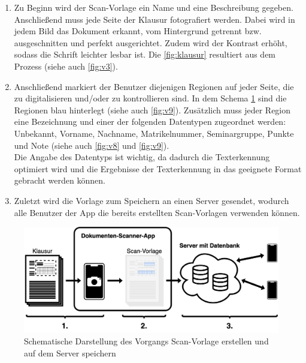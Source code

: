 \documentclass[notables, nomenclature, oneside, 150]{HSMW-Thesis}
\begin{document}
		\begin{enumerate}
			\item Zu Beginn wird der Scan-Vorlage ein Name und eine Beschreibung gegeben. Anschließend muss jede Seite der Klausur fotografiert werden. Dabei wird in jedem Bild das Dokument erkannt, vom Hintergrund getrennt bzw. ausgeschnitten und perfekt ausgerichtet. Zudem wird der Kontrast erhöht, sodass die Schrift leichter lesbar ist. Die \autoref{fig:klausur} resultiert aus dem Prozess (siehe auch \autoref{fig:v3}). 
		
			\item Anschließend markiert der Benutzer diejenigen Regionen auf jeder Seite, die zu digitalisieren und/oder zu kontrollieren sind. In dem Schema \ref{fig:schema1} sind die Regionen blau hinterlegt (siehe auch \autoref{fig:v9}). Zusätzlich muss jeder Region eine Bezeichnung und einer der folgenden Datentypen zugeordnet werden: Unbekannt, Vorname, Nachname, Matrikelnummer, Seminargruppe, Punkte und Note (siehe auch \autoref{fig:v8} und \ref{fig:v9}).\\
			Die Angabe des Datentyps ist wichtig, da dadurch die Texterkennung optimiert wird und die Ergebnisse der Texterkennung in das geeignete Format gebracht werden können. \label{it:zwei}
			
			\item Zuletzt wird die Vorlage zum Speichern an einen Server gesendet, wodurch alle Benutzer der App die bereits erstellten Scan-Vorlagen verwenden können.
		\end{enumerate}
		
		\begin{figure}[th]
    		\centering
    		\includegraphics[width=\textwidth]{img/schema1}
    		\caption{Schematische Darstellung des Vorgangs Scan-Vorlage erstellen und auf dem Server speichern}
    		\label{fig:schema1}
    	\end{figure}
		
\end{document}
